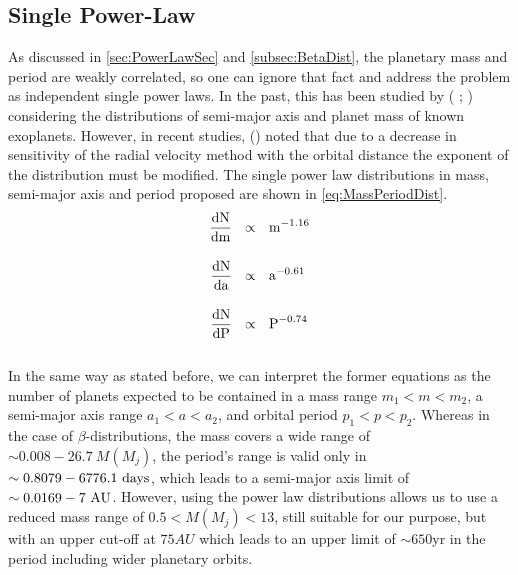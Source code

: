 \subsection{Single Power-Law} \label{subsec:SPLDist}

As discussed in \autoref{sec:PowerLawSec} and \autoref{subsec:BetaDist}, the planetary mass and period are weakly correlated, so one can ignore that fact and address the problem as independent single power laws. In the past, this has been studied by ( \citeyear{2008PASP..120..531C};  \citeyear{2006ApJ...646..505B}) considering the distributions of semi-major axis and planet mass of known exoplanets. However, in recent studies,  (\citeyear{2010EAS....41..107N}) noted that due to a decrease in sensitivity of the radial velocity method with the orbital distance the exponent of the distribution must be modified. The single power law distributions in mass, semi-major axis and period proposed are shown in \autoref{eq:MassPeriodDist}.\\

\begingroup
\Large
\begin{equation}
  \begin{align*}
    \frac{\textnormal{dN}}{\textnormal{dm}}~~&\propto~~\textnormal{m}^{-1.16} \\[10pt]
    \frac{\textnormal{dN}}{\textnormal{da}}~~&\propto~~\textnormal{a}^{-0.61} \\[10pt]
    \frac{\textnormal{dN}}{\textnormal{dP}}~~&\propto~~\textnormal{P}^{-0.74}
    \label{eq:MassPeriodDist}    
 \end{align*}
\end{equation}
\endgroup\\

In the same way as stated before, we can interpret the former equations as the number of planets expected to be contained in a mass range $m_1 < m < m_2$, a semi-major axis range $a_1 < a < a_2$, and orbital period $p_1 < p < p_2$. Whereas in the case of $\beta$-distributions, the mass covers a wide range of $\sim0.008-26.7~M(M_j)$, the period's range is valid only in $\sim0.8079-6776.1~\textnormal{days}$, which leads to a semi-major axis limit of $\sim0.0169-7~\textnormal{AU}$. However, using the power law distributions allows us to use a reduced mass range of $0.5 < M(M_j) < 13$, still suitable for our purpose, but with an upper cut-off at $75 AU$ which leads to an upper limit of $\sim 650$yr in the period including wider planetary orbits.    

